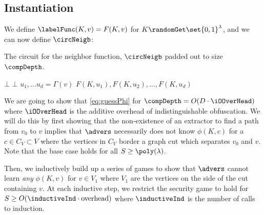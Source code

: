 \subsection{Instantiation}
We define 
$
	\labelFunc(K, v) = F(K, v)
$ for $K \randomGet \set{0, 1}^\lambda$, and we can now define $\circNeigb$:
\begin{algorithm}[H]
	\caption{
		The circuit for the neighbor function, $\circNeigb$ padded out to size $\compDepth$.
	}
	\begin{algorithmic}[1]
				\State \Return $\bot$
			\EndIf
				\State \Return $\bot$
			\EndIf
			\State $u_1, \dots u_d = \Gamma(v)$
			\State \Return $F(K, u_1), F(K, u_2), \dots, F(K, u_d)$
		\EndFunction
	\end{algorithmic}
	\label{alg:neighb}
\end{algorithm}

We are going to show that \cref{eq:guessPhi} for $\compDepth = O(D \cdot \iOOverHead)$ where $\iOOverHead$ is the additive overhead of indistinguishable obfuscation.
We will do this by first showing that the non-existence of an extractor to find a path from $v_0$ to $v$ implies that $\advers$
necessarily does not know $\phi(K, c)$ for a $c \in C_V \subset V$ where the vertices in $C_V$ border 
a graph cut which separates $v_0$ and $v$. Note that the base case holds for all $S \geq \poly(\lambda)$. 

Then, we inductively build up a series of games to show that
$\advers$ cannot learn \emph{any} $\phi(K, v)$ for $v \in V_1$ where $V_1$ are the vertices on the side of the cut containing $v$.
At each inductive step, we restrict the security game to hold for $S \geq O(\inductiveInd \cdot \text{overhead})$ where $\inductiveInd$ is the number of calls to induction.

